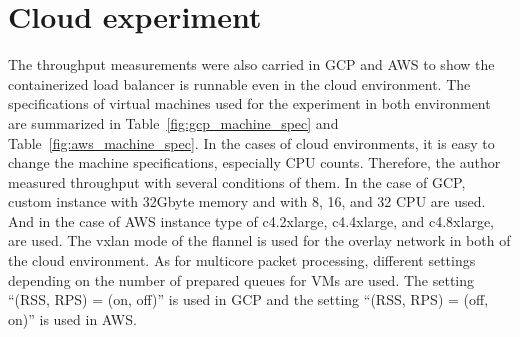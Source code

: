 \FloatBarrier

\section{Cloud experiment}

The throughput measurements were also carried  in GCP and AWS to show the containerized  load balancer is runnable even in the cloud environment.
The specifications of virtual machines used for the experiment in both environment are summarized in Table~\ref{fig:gcp_machine_spec} and Table~\ref{fig:aws_machine_spec}.
In the cases of cloud environments, it is easy to change the machine specifications, especially CPU counts.
Therefore, the author measured throughput with several conditions of them.
In the case of GCP, custom instance with 32Gbyte memory and with 8, 16, and 32 CPU are used.
And in the case of AWS instance type of c4.2xlarge, c4.4xlarge, and c4.8xlarge, are used.
The vxlan mode of the flannel is used for the overlay network in both of the cloud environment.
As for multicore packet processing, different settings depending on the number of prepared queues for VMs are used. 
The setting \enquote{(RSS, RPS) = (on, off)} is used in GCP and the setting \enquote{(RSS, RPS) = (off, on)} is used in AWS.

